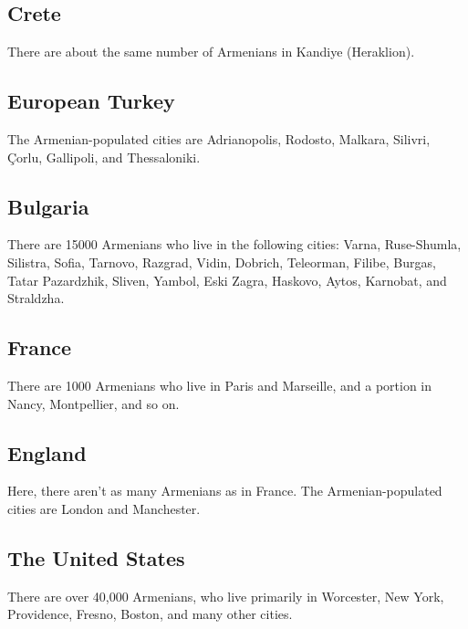 \subsection{Crete}


There are about the same number of Armenians   in Kandiye (Heraklion). 


\subsection{European Turkey}

The Armenian-populated cities are Adrianopolis, Rodosto, Malkara, Silivri, Çorlu, Gallipoli, and Thessaloniki.

\subsection{Bulgaria}

There are 15000 Armenians who live in the following cities: Varna, Ruse-Shumla, Silistra, Sofia, Tarnovo, Razgrad, Vidin, Dobrich, Teleorman, Filibe, Burgas, Tatar Pazardzhik, Sliven, Yambol, Eski Zagra, Haskovo, Aytos, Karnobat, and Straldzha. 

\subsection{France}

There are 1000 Armenians who live in Paris and Marseille, and a portion in Nancy, Montpellier, and so on.

\subsection{England}

Here, there aren't as many Armenians as in France. The Armenian-populated cities are London and Manchester. 

\subsection{The United States}

There are over 40,000 Armenians, who live primarily in Worcester, New York, Providence, Fresno, Boston, and many other cities.

\begin{adjarianpage}\label{page:30}\end{adjarianpage}%

